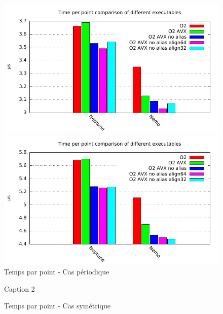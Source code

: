 \begin{figure}	
  \centering
  \begin{minipage}{.5\textwidth}
    \centering
    \includegraphics[width=.9\linewidth]{gnuplot/bench_scalaire_per_compute.pdf}
  \end{minipage}%
  \begin{minipage}{.5\textwidth}
    \centering
    \includegraphics[width=.9\linewidth]{gnuplot/bench_scalaire_per_diag.pdf}
  \end{minipage}
  \caption{Temps par point - Cas périodique}\label{fig:scal_tpp}
\end{figure}


\begin{figure}	
  \centering
  \begin{minipage}{.5\textwidth}
    \centering
    \caption{\label{fig:scal_compute}}
  \end{minipage}%
  \begin{minipage}{.5\textwidth}
    \centering
    \caption{\label{fig:scal_diag}Caption 2}
  \end{minipage}
  \caption{Temps par point - Cas symétrique}\label{fig:scal_tpp}
\end{figure}



